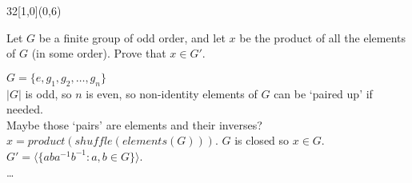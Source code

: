\documentclass[12pt]{article}
\newenvironment{exercise}[2]{\begin{textblock}{32}[1,0](0,#2)\noindent#1\end{textblock}}{\vspace{1in}}
\begin{document}
\begin{exercise}{2.41}{6}
	{\noindent}Let $G$ be a finite group of odd order, and let $x$ be the product of all the elements of $G$ (in some order). Prove that $x\in G'$.
	\bigskip

	$G=\{e, g_1, g_2, \dots, g_n\}$\\
	$|G|$ is odd, so $n$ is even, so non-identity elements of $G$ can be `paired up' if needed.\\
	Maybe those `pairs' are elements and their inverses?\\
	$x=product(shuffle(elements(G)))$. $G$ is closed so $x\in G$.\\
	$G'=\langle\{aba^{-1}b^{-1}: a,b\in G\}\rangle$.\\
	\dots
\end{exercise}
\end{document}
